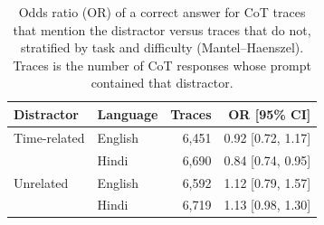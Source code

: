 \begin{table}[ht]
\centering
\small
\begin{tabular}{llrr}
\toprule
Distractor & Language & Traces & OR [95\% CI] \\
\midrule
Time-related & English & 6,451 & 0.92 [0.72, 1.17] \\
 & Hindi & 6,690 & 0.84 [0.74, 0.95] \\
\midrule
Unrelated & English & 6,592 & 1.12 [0.79, 1.57] \\
 & Hindi & 6,719 & 1.13 [0.98, 1.30] \\
\bottomrule
\end{tabular}
\caption{Odds ratio (OR) of a correct answer for CoT traces that mention the distractor versus traces that do not, stratified by task and difficulty (Mantel--Haenszel). Traces is the number of CoT responses whose prompt contained that distractor.}
\label{tab:mention-or}
\end{table}
